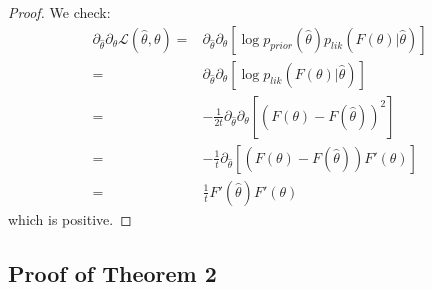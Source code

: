 \begin{proof}
We check:
\begin{align*}
 \partial_{\widehat{\theta}}\partial_\theta   \mathcal{L}(\widehat{\theta},\theta) =& \partial_{\widehat{\theta}}\partial_\theta \left[\log p_{prior}(\widehat{\theta}) p_{lik}(F(\theta)|\widehat{\theta})\right] \\
 =& \partial_{\widehat{\theta}}\partial_\theta \left[ \log p_{lik}(F(\theta)|\widehat{\theta})\right] \\
 =& -\frac{1}{2t} \partial_{\widehat{\theta}}\partial_\theta \left[ (F(\theta)-F(\widehat{\theta}))^2\right] \\
 =& -\frac{1}{t} \partial_{\widehat{\theta}} \left[ (F(\theta)-F(\widehat{\theta})) F'(\theta)\right] \\
 =& \frac{1}{t}  F'(\widehat{\theta}) F'(\theta)  
\end{align*}
which is positive.




\end{proof}

\subsection{Proof of Theorem 2}

